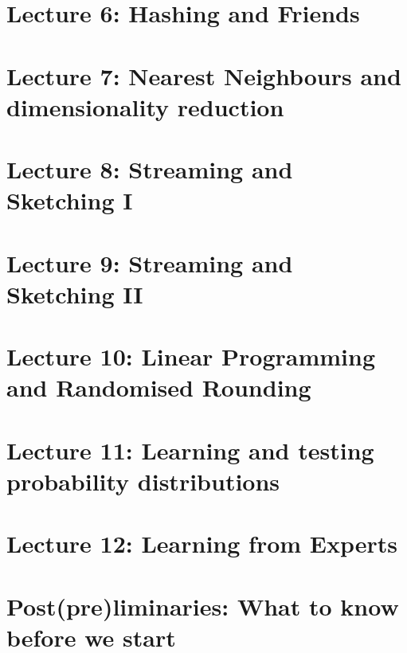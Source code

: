 \documentclass[a4paper]{tufte-book}
\begin{document}
\chapter{Lecture 6: Hashing and Friends}


\chapter{Lecture 7: Nearest Neighbours and dimensionality reduction}


\chapter{Lecture 8: Streaming and Sketching I}


\chapter{Lecture 9: Streaming and Sketching II}


\chapter{Lecture 10: Linear Programming and Randomised Rounding}


\chapter{Lecture 11: Learning and testing probability distributions}


\chapter{Lecture 12: Learning from Experts}





\chapter{Post(pre)liminaries: What to know before we start}
\label{chap:0}

\end{document}
